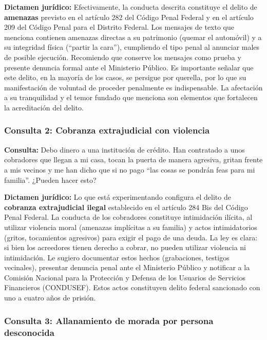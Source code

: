 \documentclass[12pt,letterpaper]{article}
\begin{document}
\textbf{Dictamen jurídico:} Efectivamente, la conducta descrita constituye el delito de \textbf{amenazas} previsto en el artículo 282 del Código Penal Federal y en el artículo 209 del Código Penal para el Distrito Federal. Los mensajes de texto que menciona contienen amenazas directas a su patrimonio (quemar el automóvil) y a su integridad física (``partir la cara''), cumpliendo el tipo penal al anunciar males de posible ejecución. Recomiendo que conserve los mensajes como prueba y presente denuncia formal ante el Ministerio Público. Es importante señalar que este delito, en la mayoría de los casos, se persigue por querella, por lo que su manifestación de voluntad de proceder penalmente es indispensable. La afectación a su tranquilidad y el temor fundado que menciona son elementos que fortalecen la acreditación del delito.

\subsubsection{Consulta 2: Cobranza extrajudicial con violencia}

\textbf{Consulta:} Debo dinero a una institución de crédito. Han contratado a unos cobradores que llegan a mi casa, tocan la puerta de manera agresiva, gritan frente a mis vecinos y me han dicho que si no pago ``las cosas se pondrán feas para mi familia''. ¿Pueden hacer esto?

\textbf{Dictamen jurídico:} Lo que está experimentando configura el delito de \textbf{cobranza extrajudicial ilegal} establecido en el artículo 284 Bis del Código Penal Federal. La conducta de los cobradores constituye intimidación ilícita, al utilizar violencia moral (amenazas implícitas a su familia) y actos intimidatorios (gritos, tocamientos agresivos) para exigir el pago de una deuda. La ley es clara: si bien los acreedores tienen derecho a cobrar, no pueden utilizar violencia ni intimidación. Le sugiero documentar estos hechos (grabaciones, testigos vecinales), presentar denuncia penal ante el Ministerio Público y notificar a la Comisión Nacional para la Protección y Defensa de los Usuarios de Servicios Financieros (CONDUSEF). Estos actos constituyen delito federal sancionado con uno a cuatro años de prisión.

\subsubsection{Consulta 3: Allanamiento de morada por persona desconocida}
\end{document}
